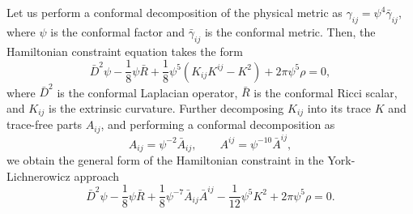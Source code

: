 Let us perform a conformal decomposition of the physical metric as
$\gamma_{ij}=\psi^4\bar{\gamma}_{ij}$,
where $\psi$ is the conformal factor and $\bar{\gamma}_{ij}$ is the conformal metric.
Then, the Hamiltonian constraint equation takes the form
\begin{equation}
    \bar{D}^2 \psi - \frac{1}{8} \psi \bar{R}
    + \frac{1}{8} \psi^5 (K_{ij}K^{ij} - K^2 )
    + 2\pi\psi^5 \rho = 0,
\end{equation}
where $\bar{D}^2$ is the conformal Laplacian operator,
$\bar{R}$ is the conformal Ricci scalar, and $K_{ij}$ is the extrinsic curvature.
Further decomposing $K_{ij}$ into its trace $K$ and trace-free parts $A_{ij}$,
and performing a conformal decomposition as
\begin{equation}
    A_{ij} = \psi^{-2}\bar{A}_{ij},
    \quad \quad
    A^{ij} = \psi^{-10}\bar{A}^{ij},
\end{equation}
we obtain the general form of the Hamiltonian constraint in the York-Lichnerowicz approach
\begin{equation}
    \bar{D}^2 \psi
    - \frac{1}{8} \psi \bar{R}
    + \frac{1}{8} \psi^{-7} \bar{A}_{ij}\bar{A}^{ij}
    - \frac{1}{12} \psi^5 K^2
    + 2\pi\psi^5 \rho = 0.
\end{equation}

